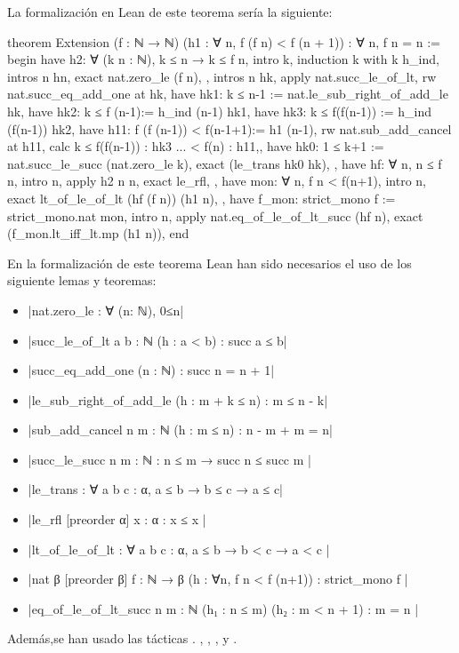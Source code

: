 La formalización en Lean de este teorema sería la siguiente:
\begin{leancode}
theorem Extension
  (f : ℕ → ℕ)
  (h1 : ∀ n, f (f n) < f (n + 1))
  : ∀ n, f n = n :=
begin
  have h2: ∀ (k n : ℕ), k ≤ n → k ≤ f n,
  { intro k,
     induction k with k h_ind,
     { intros n hn,
       exact nat.zero_le (f n), },
     { intros n hk,
       apply nat.succ_le_of_lt,
       rw nat.succ_eq_add_one at hk,
       have hk1: k ≤ n-1 := nat.le_sub_right_of_add_le hk,
       have hk2: k ≤ f (n-1):= h_ind (n-1) hk1,
       have hk3: k ≤ f(f(n-1)) := h_ind (f(n-1)) hk2,
       have h11: f (f (n-1)) < f(n-1+1):= h1 (n-1),
       rw nat.sub_add_cancel at h11,
       { calc k ≤ f(f(n-1)) : hk3
            ... < f(n)      : h11,},
       have hk0: 1 ≤ k+1 := nat.succ_le_succ (nat.zero_le k),
       exact (le_trans hk0 hk), }},
  have hf: ∀ n, n ≤ f n,
    { intro n,
      apply h2 n n,
      exact le_rfl, },
  have mon: ∀ n, f n < f(n+1),
    { intro n,
      exact lt_of_le_of_lt (hf (f n)) (h1 n), },
  have f_mon: strict_mono f := strict_mono.nat mon,
  intro n,
  apply nat.eq_of_le_of_lt_succ (hf n),
  exact (f_mon.lt_iff_lt.mp (h1 n)),
end
\end{leancode}

En la formalización de este teorema Lean han sido necesarios el uso
de los siguiente lemas y teoremas:
\begin{itemize}
\item {}|nat.zero_le : ∀ (n: ℕ), 0≤n|
\item {}|succ_le_of_lt {a b : ℕ} (h : a < b) : succ a ≤ b|
\item {}|succ_eq_add_one (n : ℕ) : succ n = n + 1|
\item {}|le_sub_right_of_add_le (h : m + k ≤ n) : m ≤ n - k|
\item {}|sub_add_cancel {n m : ℕ} (h : m ≤ n) : n - m + m = n|
\item {}|succ_le_succ {n m : ℕ} : n ≤ m → succ n ≤ succ m |
\item {}|le_trans : ∀ {a b c : α}, a ≤ b → b ≤ c → a ≤ c|
\item {}|le_rfl [preorder α] {x : α} : x ≤ x |
\item {}|lt_of_le_of_lt : ∀ {a b c : α}, a ≤ b → b < c → a < c |
\item {}|nat {β} [preorder β] {f : ℕ → β} (h : ∀n, f n < f (n+1)) :  strict_mono f |
\item {}|eq_of_le_of_lt_succ {n m : ℕ} (h₁ : n ≤ m) (h₂ : m < n + 1) : m = n |
\end{itemize}
Además,se han usado las tácticas
.
,
,
,
 y
.

